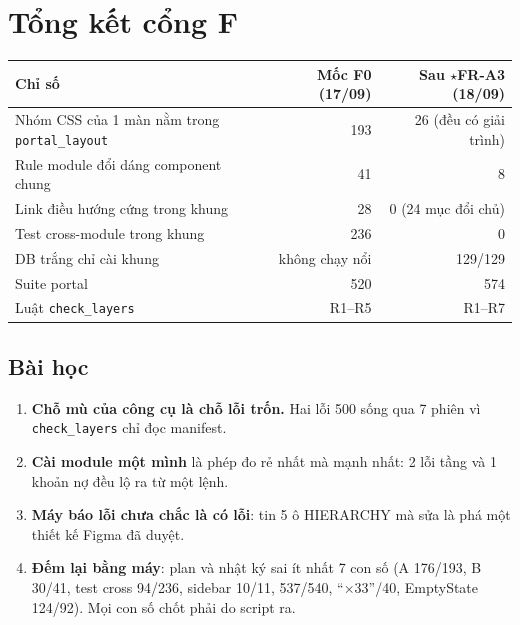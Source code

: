 \section{Tổng kết cổng F}

\begin{center}
\small
\begin{tabular}{lrr}
\toprule
Chỉ số & Mốc F0 (17/09) & Sau $\star$FR-A3 (18/09) \\
\midrule
Nhóm CSS của 1 màn nằm trong \texttt{portal\_layout} & 193 & 26 (đều có giải trình) \\
Rule module đổi dáng component chung & 41 & 8 \\
Link điều hướng cứng trong khung & 28 & 0 (24 mục đổi chủ) \\
Test cross-module trong khung & 236 & 0 \\
DB trắng chỉ cài khung & không chạy nổi & 129/129 \\
Suite portal & 520 & 574 \\
Luật \texttt{check\_layers} & R1--R5 & R1--R7 \\
\bottomrule
\end{tabular}
\end{center}

\subsection*{Bài học}
\begin{enumerate}
\item \textbf{Chỗ mù của công cụ là chỗ lỗi trốn.} Hai lỗi 500 sống qua 7 phiên vì \texttt{check\_layers} chỉ đọc manifest.
\item \textbf{Cài module một mình} là phép đo rẻ nhất mà mạnh nhất: 2 lỗi tầng và 1 khoản nợ đều lộ ra từ một lệnh.
\item \textbf{Máy báo lỗi chưa chắc là có lỗi}: tin 5 ô HIERARCHY mà sửa là phá một thiết kế Figma đã duyệt.
\item \textbf{Đếm lại bằng máy}: plan và nhật ký sai ít nhất 7 con số (A 176/193, B 30/41, test cross 94/236,
  sidebar 10/11, 537/540, ``×33''/40, EmptyState 124/92). Mọi con số chốt phải do script ra.
\end{enumerate}

